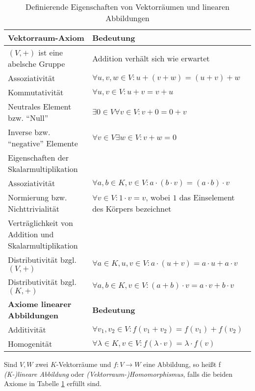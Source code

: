 \begin{definition}
\begin{table}[!ht]
\begin{tabularx}{\textwidth}{p{7cm} X}
		\toprule
		\textbf{Vektorraum-Axiom}                            & \textbf{Bedeutung} \\
		\midrule
        $(V,+)$ ist eine abelsche Gruppe                     & Addition verhält sich wie erwartet \\
		\hspace{1cm}Assoziativität                           & $\forall u,v,w\in V: u+(v+w) = (u+v)+w$  \\
		\hspace{1cm}Kommutativität                           & $\forall u,v\in V: u+v=v+u$ \\
		\hspace{1cm}Neutrales Element bzw. \enquote{Null}    & $\exists 0\in V\forall v\in V: v+0=0+v$  \\
		\hspace{1cm}Inverse bzw. \enquote{negative} Elemente & $\forall v \in V\exists w \in V: v+w=0$ \\
        Eigenschaften der Skalarmultiplikation \\
		\hspace{1cm}Assoziativität                           & $\forall a,b\in K, v\in V: a\cdot(b\cdot v) = (a\cdot b)\cdot v$ \\
		\hspace{1cm}Normierung bzw. Nichttrivialität         & $\forall v \in V: 1 \cdot v = v$, wobei $1$ das Einselement des Körpers bezeichnet \\
        Verträglichkeit von Addition und Skalarmultiplikation \\
		\hspace{1cm}Distributivität bzgl. $(V,+)$            & $\forall a\in K, u,v\in V: a\cdot(u + v) = a\cdot u + a\cdot v$ \\
		\hspace{1cm}Distributivität bzgl. $(K,+)$            & $\forall a,b\in K, v\in V: (a + b)\cdot v = a\cdot v + b\cdot v$ \\
        
        \textbf{Axiome linearer Abbildungen}                  & \textbf{Bedeutung} \\
        \midrule
        Additivität & $\forall v_1,v_2\in V: f(v_1+v_2) = f(v_1)+f(v_2)$ \\
        Homogenität & $\forall \lambda\in K, v\in V: f(\lambda\cdot v) = \lambda \cdot f(v)$ \\
        \bottomrule
	\end{tabularx}
	\caption{Definierende Eigenschaften von Vektorräumen und linearen Abbildungen}
    \label{vektorraeume:def_table}
\end{table}

Sind $V,W$ zwei $K$-Vektorräume und $f: V\to W$ eine Abbildung, so heißt f \emph{(K-)lineare Abbildung} oder \emph{(Vektorraum-)Homomorphismus}, falls die beiden Axiome in Tabelle \ref{vektorraeume:def_table} erfüllt sind.
\end{definition}

